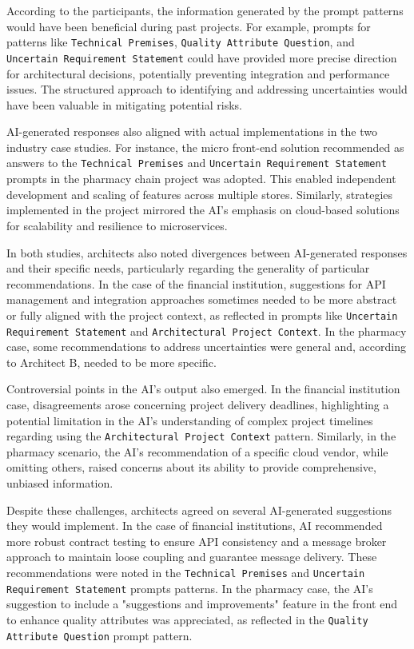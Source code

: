 \documentclass[runningheads]{llncs}
\begin{document}
According to the participants, the information generated by the prompt patterns would have been beneficial during past projects. For example, prompts for patterns like \texttt{Technical Premises}, \texttt{Quality Attribute Question}, and \texttt{Uncertain Requirement Statement} could have provided more precise direction for architectural decisions, potentially preventing integration and performance issues. The structured approach to identifying and addressing uncertainties would have been valuable in mitigating potential risks.

AI-generated responses also aligned with actual implementations in the two industry case studies. For instance, the micro front-end solution recommended as answers to the \texttt{Technical Premises} and \texttt{Uncertain Requirement Statement} prompts in the pharmacy chain project was adopted. This enabled independent development and scaling of features across multiple stores. Similarly, strategies implemented in the project mirrored the AI’s emphasis on cloud-based solutions for scalability and resilience to microservices.

In both studies, architects also noted divergences between AI-generated responses and their specific needs, particularly regarding the generality of particular recommendations. In the case of the financial institution, suggestions for API management and integration approaches sometimes needed to be more abstract or fully aligned with the project context, as reflected in prompts like \texttt{Uncertain Requirement Statement} and \texttt{Architectural Project Context}. In the pharmacy case, some recommendations to address uncertainties were general and, according to Architect B, needed to be more specific.

Controversial points in the AI’s output also emerged. In the financial institution case, disagreements arose concerning project delivery deadlines, highlighting a potential limitation in the AI’s understanding of complex project timelines regarding using the \texttt{Architectural Project Context} pattern. Similarly, in the pharmacy scenario, the AI’s recommendation of a specific cloud vendor, while omitting others, raised concerns about its ability to provide comprehensive, unbiased information.

Despite these challenges, architects agreed on several AI-generated suggestions they would implement. In the case of financial institutions, AI recommended more robust contract testing to ensure API consistency and a message broker approach to maintain loose coupling and guarantee message delivery. These recommendations were noted in the \texttt{Technical Premises} and \texttt{Uncertain Requirement Statement} prompts patterns. In the pharmacy case, the AI’s suggestion to include a "suggestions and improvements" feature in the front end to enhance quality attributes was appreciated, as reflected in the \texttt{Quality Attribute Question} prompt pattern.
\end{document}
